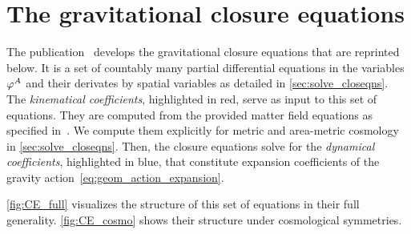 \chapter{The gravitational closure equations}\label{sec:closure_eqns}

The publication~\autocite{Schuller2016} develops the gravitational closure equations that are reprinted below. It is a set of countably many partial differential equations in the variables~$\varphi^A$ and their derivates by spatial variables as detailed in \autoref{sec:solve_closeqns}. The \emph{kinematical coefficients}, highlighted in red, serve as input to this set of equations. They are computed from the provided matter field equations as specified in~\autocite{Schuller2016}. We compute them explicitly for metric and area-metric cosmology in \autoref{sec:solve_closeqns}. Then, the closure equations solve for the \emph{dynamical coefficients}, highlighted in blue, that constitute expansion coefficients of the gravity action~\eqref{eq:geom_action_expansion}.

\autoref{fig:CE_full} visualizes the structure of this set of equations in their full generality. \autoref{fig:CE_cosmo} shows their structure under cosmological symmetries.

